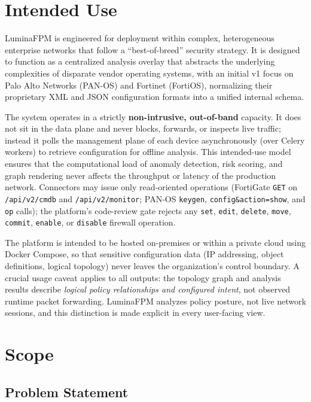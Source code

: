 \documentclass[12pt,a4paper]{report}
\renewcommand{\_}{\textunderscore\allowbreak}
\begin{document}
\section{Intended Use}
\label{sec:ch1-use}

LuminaFPM is engineered for deployment within complex, heterogeneous enterprise networks that follow a ``best-of-breed'' security strategy. It is designed to function as a centralized analysis overlay that abstracts the underlying complexities of disparate vendor operating systems, with an initial v1 focus on Palo Alto Networks (PAN-OS) and Fortinet (FortiOS), normalizing their proprietary XML and JSON configuration formats into a unified internal schema.

The system operates in a strictly \textbf{non-intrusive, out-of-band} capacity. It does not sit in the data plane and never blocks, forwards, or inspects live traffic; instead it polls the management plane of each device asynchronously (over Celery workers) to retrieve configuration for offline analysis. This intended-use model ensures that the computational load of anomaly detection, risk scoring, and graph rendering never affects the throughput or latency of the production network. Connectors may issue only read-oriented operations (FortiGate \texttt{GET} on \texttt{/api/v2/cmdb} and \texttt{/api/v2/monitor}; PAN-OS \texttt{keygen}, \texttt{config\&action=show}, and \texttt{op} calls); the platform's code-review gate rejects any \texttt{set}, \texttt{edit}, \texttt{delete}, \texttt{move}, \texttt{commit}, \texttt{enable}, or \texttt{disable} firewall operation.

The platform is intended to be hosted on-premises or within a private cloud using Docker Compose, so that sensitive configuration data (IP addressing, object definitions, logical topology) never leaves the organization's control boundary. A crucial usage caveat applies to all outputs: the topology graph and analysis results describe \emph{logical policy relationships and configured intent}, not observed runtime packet forwarding. LuminaFPM analyzes policy posture, not live network sessions, and this distinction is made explicit in every user-facing view.

\section{Scope}
\label{sec:ch1-scope}

\subsection{Problem Statement}
\label{sec:ch1-problem}
\end{document}
